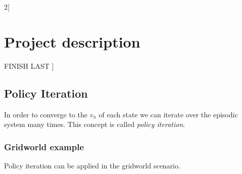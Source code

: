 \documentclass[a4paper]{article}
\begin{document}
\begin{multicols}{2}[
		\section*{Project description}
		FINISH LAST
		]
		\subsection{Policy Iteration}
		In order to converge to the $v_\pi$ of each state we can iterate over the episodic system many times. This concept is called \textit{policy iteration}.
		
		\subsubsection{Gridworld example}
		Policy iteration can be applied in the gridworld scenario.
		
		
		
		
		\end{multicols}
		\newpage
	
%			
%			






\end{document}
